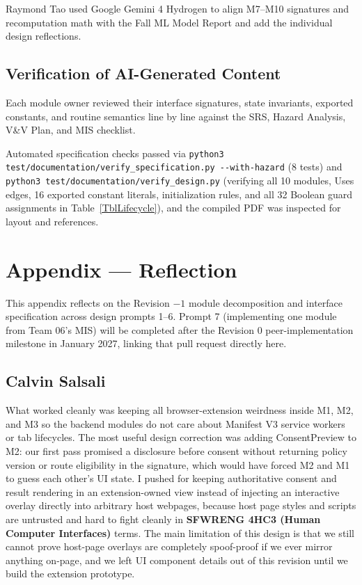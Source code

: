 \documentclass[12pt, titlepage]{article}
\newcommand{\ty}[1]{\textsf{#1}}
\begin{document}
\medskip\noindent Raymond Tao used Google Gemini 4 Hydrogen to align M7--M10 signatures and recomputation math with the Fall ML Model Report and add the individual design reflections.

\subsection{Verification of AI-Generated Content}

\noindent Each module owner reviewed their interface signatures, state invariants, exported constants, and routine semantics line by line against the SRS, Hazard Analysis, V\&V Plan, and MIS checklist.

\medskip\noindent Automated specification checks passed via \texttt{python3 test/\allowbreak{}documentation/\allowbreak{}verify\_\allowbreak{}specification.py -{}-with-hazard} (8 tests) and \texttt{python3 test/\allowbreak{}documentation/\allowbreak{}verify\_\allowbreak{}design.py} (verifying all 10 modules, Uses edges, 16 exported constant literals, initialization rules, and all 32 Boolean guard assignments in Table~\ref{TblLifecycle}), and the compiled PDF was inspected for layout and references.

\newpage{}

\section{Appendix --- Reflection}

This appendix reflects on the Revision $-1$ module decomposition and interface specification across design prompts 1--6. Prompt 7 (implementing one module from Team 06's MIS) will be completed after the Revision 0 peer-implementation milestone in January 2027, linking that pull request directly here.

\subsection{Calvin Salsali}

What worked cleanly was keeping all browser-extension weirdness inside M1, M2, and M3 so the backend modules do not care about Manifest V3 service workers or tab lifecycles. The most useful design correction was adding \ty{ConsentPreview} to M2: our first pass promised a disclosure before consent without returning policy version or route eligibility in the signature, which would have forced M2 and M1 to guess each other's UI state. I pushed for keeping authoritative consent and result rendering in an extension-owned view instead of injecting an interactive overlay directly into arbitrary host webpages, because host page styles and scripts are untrusted and hard to fight cleanly in \textbf{SFWRENG 4HC3 (Human Computer Interfaces)} terms. The main limitation of this design is that we still cannot prove host-page overlays are completely spoof-proof if we ever mirror anything on-page, and we left UI component details out of this revision until we build the extension prototype.
\end{document}
